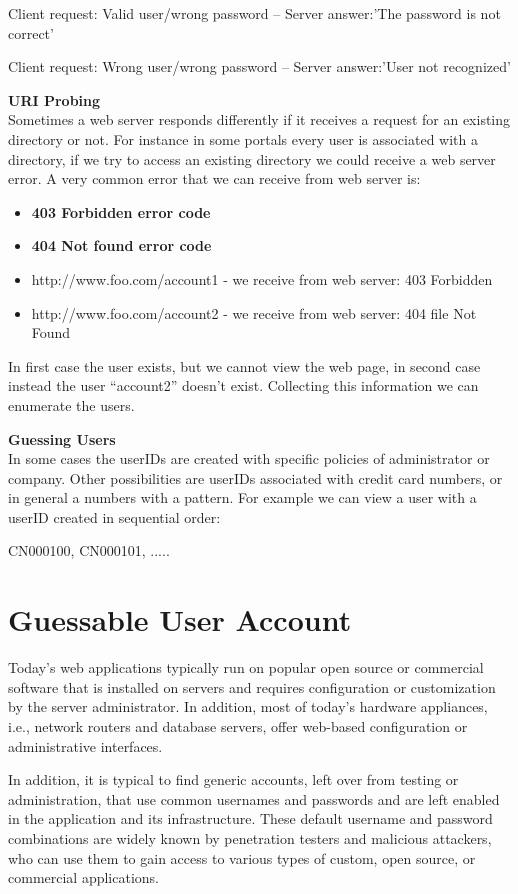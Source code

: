	{\color{red} Client request: Valid user/wrong password -- Server answer:'The password is not correct'}

	{\color{red} Client request: Wrong user/wrong password -- Server answer:'User not recognized'}

	{\bf URI Probing} \\
	Sometimes a web server responds differently if it receives a request for an existing directory or 
	not. For instance in some portals every user is associated with a directory, if we try to access 
	an existing directory we could receive a web server error. A very common error that we can receive 
	from web server is:

	\begin{itemize}
		\item {\bf 403 Forbidden error code}
		\item {\bf 404 Not found error code}
		\item http://www.foo.com/account1 - we receive from web server: 403 Forbidden
		\item http://www.foo.com/account2 - we receive from web server: 404 file Not Found
	\end{itemize}

	In first case the user exists, but we cannot view the web page, in second case instead the user
	“account2” doesn’t exist. Collecting this information we can enumerate the users.

	{\bf Guessing Users} \\
	In some cases the userIDs are created with specific policies of administrator or company. 
	Other possibilities are userIDs associated with credit card numbers, or in general a numbers 
	with a pattern. For example we can view a user with a userID created in sequential order:

	{\color{blue} CN000100, CN000101, .....}

\section{Guessable User Account}

	Today's web applications typically run on popular open source or commercial software that is 
	installed on servers and requires configuration or customization by the server administrator. 
	In addition, most of today's hardware appliances, i.e., network routers and database servers, 
	offer web-based configuration or administrative interfaces.

	In addition, it is typical to find generic accounts, left over from testing or administration,
	that use common usernames and passwords and are left enabled in the application and its 
	infrastructure. These default username and password combinations are widely known by penetration 
	testers and malicious attackers, who can use them to gain access to various types of custom, 
	open source, or commercial applications.

